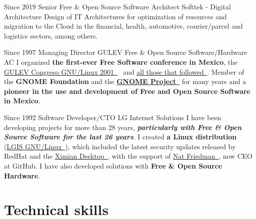 \documentclass[]{friggeri-cv}
\begin{document}
\begin{entrylist}
    \entry%
    {Since 2019}
    {Senior Free \& Open Source Software Architect}
    {Softtek - Digital Architecture}
    {Design of IT Architectures for optimization of resources and migration to the Cloud in the financial, health, automotive, courier/parcel and logistics sectors, among others.}
\end{entrylist}

\begin{entrylist}
    \entry%
    {Since 1997}
    {Managing Director}
    {GULEV Free \& Open Source Software/Hardware AC}
    {I organized \textbf{the first-ever Free Software conference in Mexico}, the \href{http://gulev.org.mx/eventos/gulev2001}{GULEV Congreso GNU/Linux 2001~{\nfURL}}~ and \href{http://gulev.org.mx/conferences}{all those that followed~{\nfURL}}. Member of the \textbf{GNOME Foundation} and the \href{https://www.gnome.org/}{\textbf{GNOME Project}~{\nfURL}} for many years and a \textbf{pioneer in the use and development of Free and Open Source Software in Mexico}. }
\end{entrylist}

\begin{entrylist}
    \entry%
    {Since 1992}
    {Software Developer/CTO}
    {LG Internet Solutions}
    {I have been developing projects for more than 28 years, \textbf{\textit{particularly with Free \& Open Source Software for the last 26 years}}. I created \textbf{a Linux distribution} (\href{https://distrowatch.com/table.php?distribution=lgis}{LGIS GNU/Linux~{\nfURL}}), which included the latest security updates released by RedHat and the \href{https://en.wikipedia.org/wiki/Ximian}{Ximian Desktop~{\nfURL}}, with the support of \href{https://www.linkedin.com/in/natfriedman/}{Nat Friedman~{\nfURL}}, now CEO at GitHub. I have also developed solutions with \textbf{Free \& Open Source Hardware}.}
\end{entrylist}

\section{Technical skills}
\end{document}
